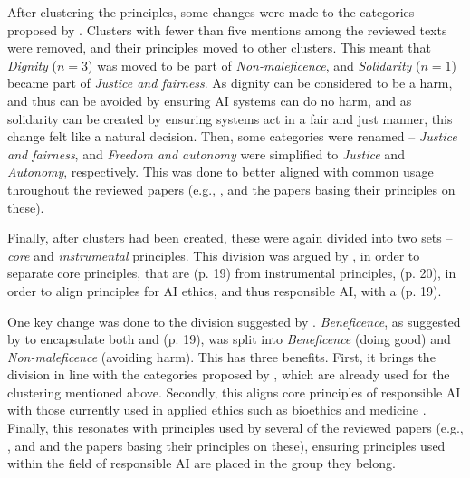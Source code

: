 After clustering the principles, some changes were made to the categories proposed by \textcite{Ryan_2021}. Clusters with fewer than five mentions among the reviewed texts were removed, and their principles moved to other clusters. This meant that \textit{Dignity} ($n = 3$) was moved to be part of \textit{Non-maleficence}, and \textit{Solidarity} ($n = 1$) became part of \textit{Justice and fairness}. As dignity can be considered to be a harm, and thus can be avoided by ensuring AI systems can do no harm, and as solidarity can be created by ensuring systems act in a fair and just manner, this change felt like a natural decision. Then, some categories were renamed -- \textit{Justice and fairness}, and \textit{Freedom and autonomy} were simplified to \textit{Justice} and \textit{Autonomy}, respectively. This was done to better aligned with common usage throughout the reviewed papers (e.g., \cite{Balagué_2021,Floridi_2018}, and the papers basing their principles on these). 

Finally, after clusters had been created, these were again divided into two sets -- \emph{core} and \emph{instrumental} principles. This division was argued by \textcite{Canca_2020}, in order to separate core principles, that are  (p. 19) from instrumental principles,  (p. 20), in order to align principles for AI ethics, and thus responsible AI, with a  (p. 19).

One key change was done to the division suggested by \textcite{Canca_2020}. \textit{Beneficence}, as suggested by \textcite{Canca_2020} to encapsulate both  and  (p. 19), was split into \textit{Beneficence} (doing good) and \textit{Non-maleficence} (avoiding harm). This has three benefits. First, it brings the division in line with the categories proposed by \textcite{Ryan_2021}, which are already used for the clustering mentioned above. Secondly, this aligns core principles of responsible AI with those currently used in applied ethics such as bioethics \parencite{Beauchamp_2001} and medicine \parencite{Gillon_2003,Gillon_1994}. Finally, this resonates with principles used by several of the reviewed papers (e.g., \cite{Balagué_2021,Floridi_2018,Jobin_2019,Nauck_2019}, and and the papers basing their principles on these), ensuring principles used within the field of responsible AI are placed in the group they belong.

